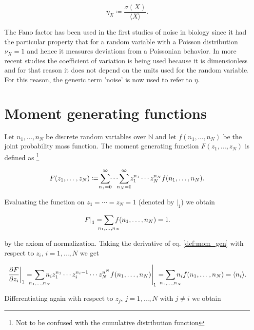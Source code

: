 \begin{equation}
  \label{eq:con-cv_def}
  \eta_X \coloneqq \frac{\sigma(X)}{\langle X \rangle}.
\end{equation}

The Fano factor has been used in the first studies of noise in biology since it had the particular property that for a random variable with a Poisson distribution $\nu_X=1$ and hence it measures deviations from a Poissonian behavior. In more recent studies the coefficient of variation is being used because it is dimensionless and for that reason it does not depend on the units used for the random variable. For this reason, the generic term 'noise' is now used to refer to $\eta$.

\section{Moment generating functions}
Let $n_1,\dotsc,n_N$ be discrete random variables over $\mathbb{N}$ and let $f(n_1,\dotsc,n_N)$ be the joint probability mass function. The moment generating function $F(z_1,\dotsc,z_N)$ is defined as \footnote{Not to be confused with the cumulative distribution function}

\begin{equation}
\label{def:mom_gen}
F(z_1,\dotsc,z_N) \coloneqq \sum_{\mathclap{n_1=0}}^{\infty} \dotsi \sum_{\mathclap{n_N=0}}^{\infty} z_1^{n_1} \dotsm z_N^{n_N} f(n_1,\dotsc,n_N).
\end{equation}

Evaluating the function on $z_1 = \dotsb = z_N = 1$ (denoted by $\left. \right|_1$) we obtain

\begin{equation*}
\left.F\right|_1 = \sum_{\mathclap{n_1,\dotsc,n_N}}f(n_1,\dotsc,n_N) = 1.
\end{equation*}

by the axiom of normalization. Taking the derivative of eq. \ref{def:mom_gen} with respect to $z_i$, $i = 1,\dotsc,N$ we get

\begin{equation*}
\left.\frac{\partial F}{\partial z_i}\right|_1 = \left.\sum_{\mathclap{n_1,\dotsc,n_N}}n_i z_1^{n_1}\dotsm z_i^{n_i-1}\dotsm z_N^{n^N}f(n_1,\dotsc,n_N)\right|_1 = \sum_{\mathclap{n_1,\dotsc,n_N}} n_i f(n_1,\dotsc,n_N) = \langle n_i \rangle.
\end{equation*}

Differentiating again with respect to $z_j$, $j=1,\dotsc,N$ with $j\neq i$ we obtain

